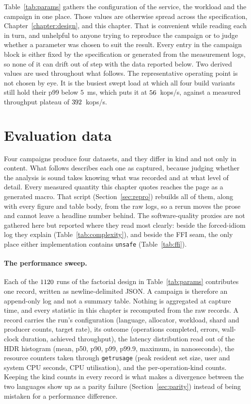 \documentclass[english,oneside,a4paper,censored,csm,software-track-2020]{HYthesisML}
\begin{document}
Table~\ref{tab:params} gathers the configuration of the service, the workload and the campaign in
one place. Those values are otherwise spread across the specification,
Chapter~\ref{chapter:design}, and this chapter. That is convenient while reading each in turn, and
unhelpful to anyone trying to reproduce the campaign or to judge whether a parameter was chosen to
suit the result. Every entry in the campaign block is either fixed by the specification or
generated from the measurement logs, so none of it can drift out of step with the data reported
below. Two derived values are used throughout what follows. The representative operating point is
not chosen by eye. It is the busiest swept load at which all four build variants still hold
their p99 below $5$~ms, which puts it at $56$~kops/s, against a measured throughput plateau
of $392$~kops/s.

\section{Evaluation data}
Four campaigns produce four datasets, and they differ in kind and not only in content. What
follows describes each one as captured, because judging whether the analysis is sound takes
knowing what was recorded and at what level of detail. Every measured
quantity this chapter quotes reaches the page as a generated macro. That script
(Section~\ref{sec:repro}) rebuilds all of them, along with every figure and table body, from the
raw logs, so a rerun moves the prose and cannot leave a headline number behind. The
software-quality
proxies are not gathered here but reported where they read most clearly: beside the
forced-idiom log they explain (Table~\ref{tab:complexity}), and beside the FFI seam, the only
place either implementation contains \texttt{unsafe} (Table~\ref{tab:ffi}).

\paragraph{The performance sweep.}
Each of the $1120$ runs of the factorial design in Table~\ref{tab:params} contributes one
record, written as newline-delimited JSON. A campaign is therefore an append-only log and not a
summary table. Nothing is aggregated at capture time, and every statistic in this chapter is
recomputed from the raw records. A record carries the run's configuration (language, allocator,
workload, shard and producer counts, target rate), its outcome (operations completed, errors,
wall-clock duration, achieved throughput), the latency distribution read out of the HDR
histogram (mean, p50, p90, p99, p99.9, maximum, in nanoseconds), the resource counters taken
through \texttt{getrusage} (peak resident set size, user and system CPU seconds, CPU
utilisation), and the per-operation-kind counts. Keeping the kind counts in every record is
what makes a divergence between the two languages show up as a parity failure
(Section~\ref{sec:parity}) instead of being mistaken for a performance difference.
\end{document}
